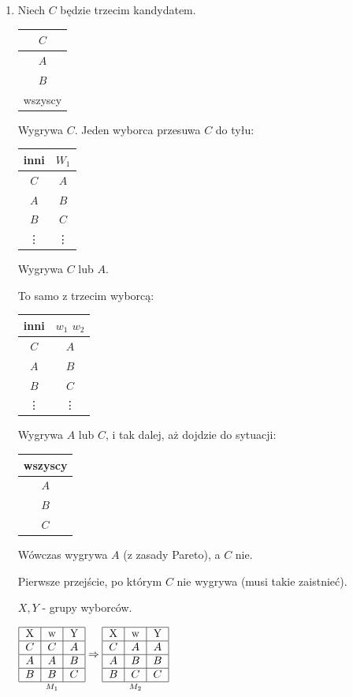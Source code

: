 \documentclass[12pt,a4paper]{article}
\theoremstyle{break}
\begin{document}
		\begin{enumerate}[Dow. I)]
			\item Niech $C$ będzie trzecim kandydatem. \begin{tabular}{|c|}\hline
				$C$ \\\hline
				$A$ \\\hline
				$B$ \\\hline
				wszyscy \\\hline
			\end{tabular}
			Wygrywa $C$. Jeden wyborca przesuwa $C$ do tyłu:
			\begin{tabular}{c|c}\hline
				inni & $W_1$ \\\hline
				$C$ & $A$ \\
				$A$ & $B$ \\
				$B$ & $C$ \\
				\vdots & \vdots \\
			\end{tabular}
			Wygrywa $C$ lub $A$.
			
			To samo z trzecim wyborcą:
			\begin{tabular}{c|c}\hline
				inni & $w_1$ $w_2$ \\\hline
				$C$ & $A$ \\
				$A$ & $B$ \\
				$B$ & $C$ \\
				\vdots & \vdots \\
			\end{tabular}
			Wygrywa $A$ lub $C$, i tak dalej, aż dojdzie do sytuacji:
			\begin{tabular}{|c|}\hline
				wszyscy \\\hline
				$A$ \\\hline
				$B$ \\\hline
				$C$ \\\hline
			\end{tabular}
			Wówczas wygrywa $A$ (z zasady Pareto), a $C$ nie.
			
			Pierwsze przejście, po którym $C$ nie wygrywa (musi takie zaistnieć). 
			
			$X, Y$ - grupy wyborców.
			
			$\underset{M_1}{\begin{tabular}{|c|c|c|}\hline
					X & w & Y \\\hline
					$C$ & $C$ & $A$ \\\hline
					$A$ & $A$ & $B$ \\\hline
					$B$ & $B$ & $C$ \\\hline
			\end{tabular}} \Rightarrow \underset{M_2}{\begin{tabular}{|c|c|c|}\hline
					X & w & Y \\\hline
					$C$ & $A$ & $A$ \\\hline
					$A$ & $B$ & $B$ \\\hline
					$B$ & $C$ & $C$ \\\hline
			\end{tabular}}$
			

\end{enumerate}
\end{document}

